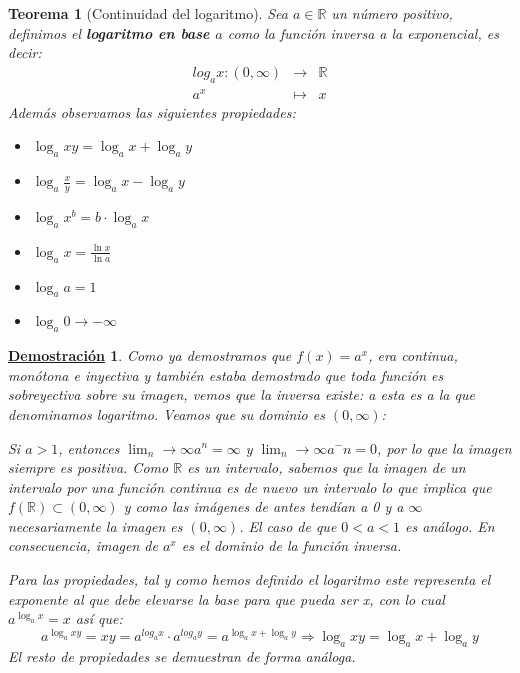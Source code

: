\documentclass[10pt,a4paper,openright]{book}
\theoremstyle{break}
\newtheorem{theo}{Teorema}[chapter]
\newtheorem*{demo}{\underline{Demostración}}
\begin{document}
\begin{theo}[Continuidad del logaritmo]
Sea $a\in \mathbb{R}$ un número positivo, definimos el \textbf{logaritmo en base $a$} como la función inversa a la exponencial, es decir:
\begin{eqnarray*} log_a x: (0,\infty) &\longrightarrow& \mathbb R \\ a^x &\longmapsto& x \end{eqnarray*}
Además observamos las siguientes propiedades:
\begin{itemize}
\item $\log_a xy = \log_a x + \log_a y$
\item $\log_a \frac{x}{y} = \log_a x - \log_a y$
\item $\log_a x^b = b\cdot \log_a x$
\item $\log_a x = \frac{\ln x}{\ln a}$
\item $\log_a a = 1$
\item $\log_a 0 \rightarrow -\infty$
\end{itemize}
\end{theo}
\begin{demo}
Como ya demostramos que $f(x)=a^x$, era continua, monótona e inyectiva y también estaba demostrado que toda función es sobreyectiva sobre su imagen, vemos que la inversa existe: a esta es a la que denominamos \textit{logaritmo}. Veamos que su dominio es $(0,\infty)$:\par
Si $a>1$, entonces $\lim_n\rightarrow \infty a^n = \infty$ y $\lim_n\rightarrow \infty a^-n = 0$, por lo que la imagen siempre es positiva. Como $\mathbb R$ es un intervalo, sabemos que la imagen de un intervalo por una función continua es de nuevo un intervalo lo que implica que $f(\mathbb R)\subset (0,\infty)$ y como las imágenes de antes tendían a 0 y a $\infty$ necesariamente la imagen es $(0,\infty)$. El caso de que $0<a<1$ es análogo. En consecuencia, imagen de $a^x$ es el dominio de la función inversa.

Para las propiedades, tal y como hemos definido el logaritmo este representa el exponente al que debe elevarse la base para que pueda ser x, con lo cual $a^{\log_a x} = x$ así que:
$$a^{\log_a xy}= xy=a^{log_a x}\cdot a^{log_a y}=a^{\log_a x + \log_a y}\Rightarrow \log_a xy = \log_a x +\log_a y$$
El resto de propiedades se demuestran de forma análoga.
\end{demo}
\end{document}
